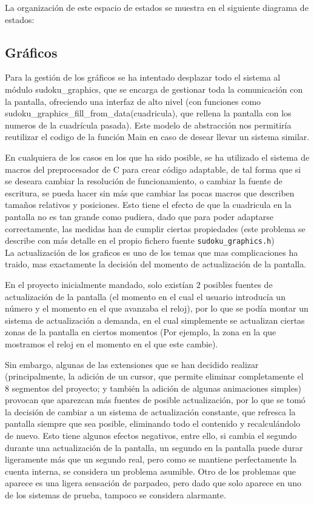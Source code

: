 \documentclass[12pt,letterpaper]{article}
\begin{document}
La organización de este espacio de estados se muestra en el siguiente
diagrama de estados:

\subsection{Gráficos}
\label{subsec:graphics}
Para la gestión de los gráficos se ha intentado desplazar todo el
sistema al módulo sudoku\_graphics, que se encarga de gestionar toda
la comunicación con la pantalla, ofreciendo una interfaz de alto nivel
(con funciones como sudoku\_graphics\_fill\_from\_data(cuadricula),
que rellena la pantalla con los numeros de la cuadrícula pasada). Este
modelo de abstracción nos permitiría reutilizar el codigo de la
función Main en caso de desear llevar un sistema similar.

En cualquiera de los casos en los que ha sido posible, se ha utilizado
el sistema de macros del preprocesador de C para crear código
adaptable, de tal forma que si se deseara cambiar la resolución de
funcionamiento, o cambiar la fuente de escritura, se pueda hacer sin
más que cambiar las pocas macros que describen tamaños relativos y
posiciones. Esto tiene el efecto de que la cuadricula en la pantalla
no es tan grande como pudiera, dado que para poder adaptarse
correctamente, las medidas han de cumplir ciertas propiedades (este
problema se describe con más detalle en el propio fichero fuente
\texttt{sudoku\_graphics.h})\\

La actualización de los graficos es uno de los temas que mas
complicaciones ha traido, mas exactamente la decisión del momento de
actualización de la pantalla.

En el proyecto inicialmente mandado, solo existían 2 posibles fuentes
de actualización de la pantalla (el momento en el cual el usuario
introducía un número y el momento en el que avanzaba el reloj), por lo
que se podía montar un sistema de actualización a demanda, en el cual
simplemente se actualizan ciertas zonas de la pantalla en ciertos
momentos (Por ejemplo, la zona en la que mostramos el reloj en el
momento en el que este cambie).

Sin embargo, algunas de las extensiones que se han decidido realizar
(principalmente, la adición de un cursor, que permite eliminar
completamente el 8 segmentos del proyecto; y también la adición de
algunas animaciones simples) provocan que aparezcan más fuentes de
posible actualización, por lo que se tomó la decisión de cambiar a un
sistema de actualización constante, que refresca la pantalla siempre
que sea posible, eliminando todo el contenido y recalculándolo de
nuevo. Esto tiene algunos efectos negativos, entre ello, si cambia el
segundo durante una actualización de la pantalla, un segundo en la
pantalla puede durar ligeramente más que un segundo real, pero como se
mantiene perfectamente la cuenta interna, se considera un problema
asumible. Otro de los problemas que aparece es una ligera sensación de
parpadeo, pero dado que solo aparece en uno de los sistemas de prueba,
tampoco se considera alarmante.\\
\end{document}

